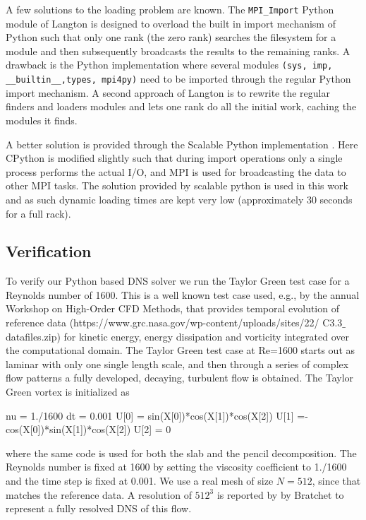 \documentclass[11pt, oneside]{article}
\newcommand{\inpyth}{\lstinline[style=pythonstyle, basicstyle=\ttfamily]} %[]%
\begin{document}
A few solutions to the loading problem are known. The \inpyth{MPI_Import} Python module of Langton \cite{mpi_import} is designed to overload the built in import mechanism of Python such that only one rank (the zero rank) searches the filesystem for a module and then subsequently broadcasts the results to the remaining ranks. A drawback is the Python implementation where several modules \inpyth{(sys, imp, __builtin__,types, mpi4py)} need to be imported through the regular Python import mechanism. A second approach of Langton is to rewrite the regular finders and loaders modules and lets one rank do all the initial work, caching the modules it finds. 

A better solution is provided through the Scalable Python implementation \cite{scalablepython, Enkovaara201117}. Here CPython is modified slightly such that during import operations only a single process performs the actual I/O, and MPI is used for broadcasting the data to other MPI tasks. The solution provided by scalable python is used in this work and as such dynamic loading times are kept very low (approximately 30 seconds for a full rack).

\subsection{Verification}
To verify our Python based DNS solver we run the Taylor Green test case for a Reynolds number of 1600. This is a well known test case used, e.g., by the annual Workshop on High-Order CFD Methods, that provides temporal evolution of reference data (https://www.grc.nasa.gov/wp-content/uploads/sites/22/ C3.3$\_$datafiles.zip) for kinetic energy, energy dissipation and vorticity integrated over the computational domain. The Taylor Green test case at Re=1600 starts out as laminar with only one single length scale, and then through a series of complex flow patterns a fully developed, decaying, turbulent flow is obtained. The Taylor Green vortex is initialized as
\begin{python}
nu = 1./1600
dt = 0.001
U[0] = sin(X[0])*cos(X[1])*cos(X[2])
U[1] =-cos(X[0])*sin(X[1])*cos(X[2])
U[2] = 0 
\end{python}
where the same code is used for both the slab and the pencil decomposition. The Reynolds number is fixed at 1600 by setting the viscosity coefficient to 1./1600 and the time step is fixed at 0.001. We use a real mesh of size $N=512$, since that matches the reference data. A resolution of $512^3$ is reported by by Bratchet \cite{brachet1991direct} to represent a fully resolved DNS of this flow. 
\end{document}
